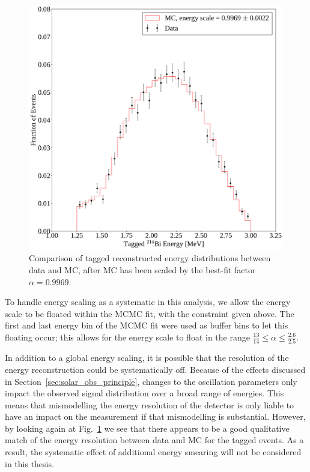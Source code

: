 \begin{figure}
    \centering
    \includegraphics[width=\textwidth]{6_SolarAnalysis/images/rafael_tagged_bi_llh_fitted.pdf}
    \caption[Comparison of tagged  reconstructed energy distributions between data and MC]
    {Comparison of tagged  reconstructed energy distributions between data and MC, after MC has been scaled by the best-fit factor $\alpha = 0.9969$.}
    \label{fig:bi214_escale_calibration}
\end{figure}

To handle energy scaling as a systematic in this analysis, we allow the energy scale to be floated within the MCMC fit, with the constraint given above. The first and last energy bin of the MCMC fit were used as buffer bins to let this floating occur; this allows for the energy scale to float in the range $\frac{13}{14}\leq\alpha\leq\frac{2.6}{2.5}$.

In addition to a global energy scaling, it is possible that the resolution of the energy reconstruction could be systematically off. Because of the effects discussed in Section~\ref{sec:solar_obs_principle}, changes to the oscillation parameters only impact the observed signal distribution over a broad range of energies. This means that mismodelling the energy resolution of the detector is only liable to have an impact on the measurement if that mismodelling is substantial. However, by looking again at Fig.~\ref{fig:bi214_escale_calibration} we see that there appears to be a good qualitative match of the energy resolution between data and MC for the tagged  events. As a result, the systematic effect of additional energy smearing will not be considered in this thesis.

